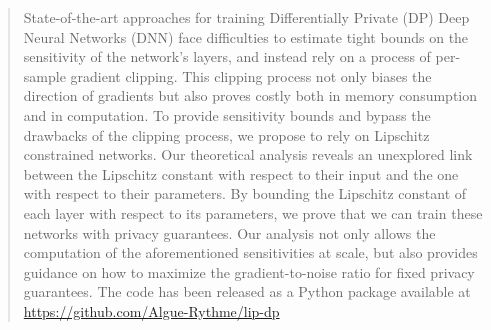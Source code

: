 \begin{abstract}
State-of-the-art approaches for training Differentially Private (DP) Deep Neural Networks (DNN) face difficulties to estimate tight bounds on the sensitivity of the network's layers, and instead rely on a process of per-sample gradient clipping. This clipping process not only biases the direction of gradients but also proves costly both in memory consumption and in computation. To provide sensitivity bounds and bypass the drawbacks of the clipping process, we propose to rely on Lipschitz constrained networks. Our theoretical analysis reveals an unexplored link between the Lipschitz constant with respect to their input and the one with respect to their parameters. By bounding the Lipschitz constant of each layer with respect to its parameters, we prove that we can train these networks with privacy guarantees.  Our analysis not only allows the computation of the aforementioned sensitivities at scale, but also provides guidance on how to maximize the gradient-to-noise ratio for fixed privacy guarantees. The code has been released as a Python package available at \url{https://github.com/Algue-Rythme/lip-dp}
\end{abstract}

